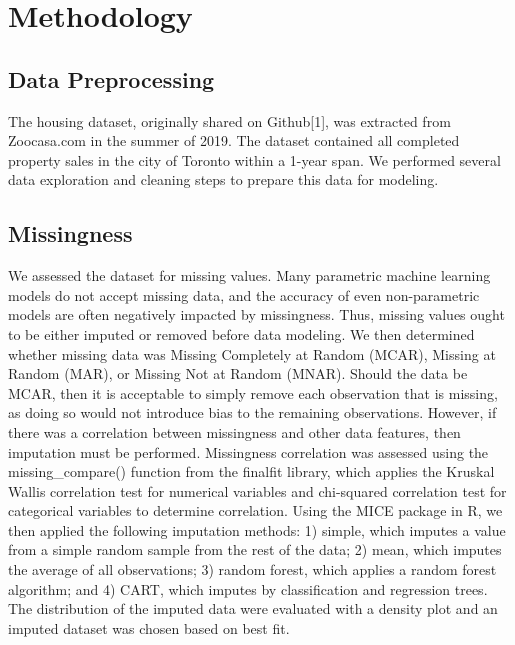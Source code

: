 \documentclass[11pt,]{article}
\begin{document}
\hypertarget{methodology}{%
\section{Methodology}\label{methodology}}

\hypertarget{data-preprocessing}{%
\subsection{Data Preprocessing}\label{data-preprocessing}}

The housing dataset, originally shared on Github{[}1{]}, was extracted
from Zoocasa.com in the summer of 2019. The dataset contained all
completed property sales in the city of Toronto within a 1-year span. We
performed several data exploration and cleaning steps to prepare this
data for modeling.

\hypertarget{missingness}{%
\subsection{Missingness}\label{missingness}}

We assessed the dataset for missing values. Many parametric machine
learning models do not accept missing data, and the accuracy of even
non-parametric models are often negatively impacted by missingness.
Thus, missing values ought to be either imputed or removed before data
modeling. We then determined whether missing data was Missing Completely
at Random (MCAR), Missing at Random (MAR), or Missing Not at Random
(MNAR). Should the data be MCAR, then it is acceptable to simply remove
each observation that is missing, as doing so would not introduce bias
to the remaining observations. However, if there was a correlation
between missingness and other data features, then imputation must be
performed. Missingness correlation was assessed using the
missing\_compare() function from the finalfit library, which applies the
Kruskal Wallis correlation test for numerical variables and chi-squared
correlation test for categorical variables to determine correlation.
Using the MICE package in R, we then applied the following imputation
methods: 1) simple, which imputes a value from a simple random sample
from the rest of the data; 2) mean, which imputes the average of all
observations; 3) random forest, which applies a random forest algorithm;
and 4) CART, which imputes by classification and regression trees. The
distribution of the imputed data were evaluated with a density plot and
an imputed dataset was chosen based on best fit.
\end{document}
